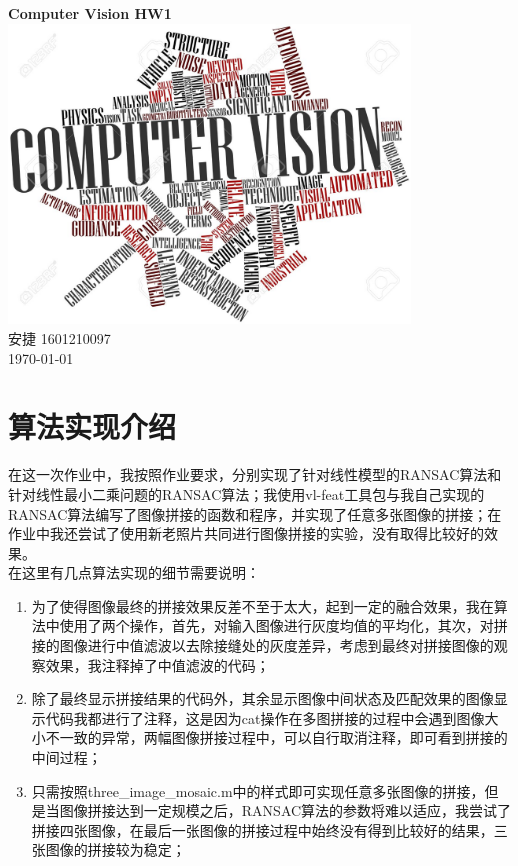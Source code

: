 \documentclass[a4paper, UTF8]{ctexrep}
\begin{document}
	\begin{titlepage}
		\centering
		\vspace{6cm}
		\LARGE{\textbf{Computer Vision HW1}}\\
		\vspace{4cm}
		\includegraphics[width=0.8\textwidth]{cv.jpg}\\
		\vspace{5cm}
		\normalsize{安捷 1601210097}\\
		\normalsize{\today}
	\end{titlepage}
  \section{算法实现介绍}
  	在这一次作业中，我按照作业要求，分别实现了针对线性模型的RANSAC算法和针对线性最小二乘问题的RANSAC算法；我使用vl-feat工具包与我自己实现的RANSAC算法编写了图像拼接的函数和程序，并实现了任意多张图像的拼接；在作业中我还尝试了使用新老照片共同进行图像拼接的实验，没有取得比较好的效果。\\
  	在这里有几点算法实现的细节需要说明：
  	\begin{enumerate}
  		\item 为了使得图像最终的拼接效果反差不至于太大，起到一定的融合效果，我在算法中使用了两个操作，首先，对输入图像进行灰度均值的平均化，其次，对拼接的图像进行中值滤波以去除接缝处的灰度差异，考虑到最终对拼接图像的观察效果，我注释掉了中值滤波的代码；
  		\item 除了最终显示拼接结果的代码外，其余显示图像中间状态及匹配效果的图像显示代码我都进行了注释，这是因为cat操作在多图拼接的过程中会遇到图像大小不一致的异常，两幅图像拼接过程中，可以自行取消注释，即可看到拼接的中间过程；
  		\item 只需按照three\_image\_mosaic.m中的样式即可实现任意多张图像的拼接，但是当图像拼接达到一定规模之后，RANSAC算法的参数将难以适应，我尝试了拼接四张图像，在最后一张图像的拼接过程中始终没有得到比较好的结果，三张图像的拼接较为稳定；
  	\end{enumerate}
\end{document}

